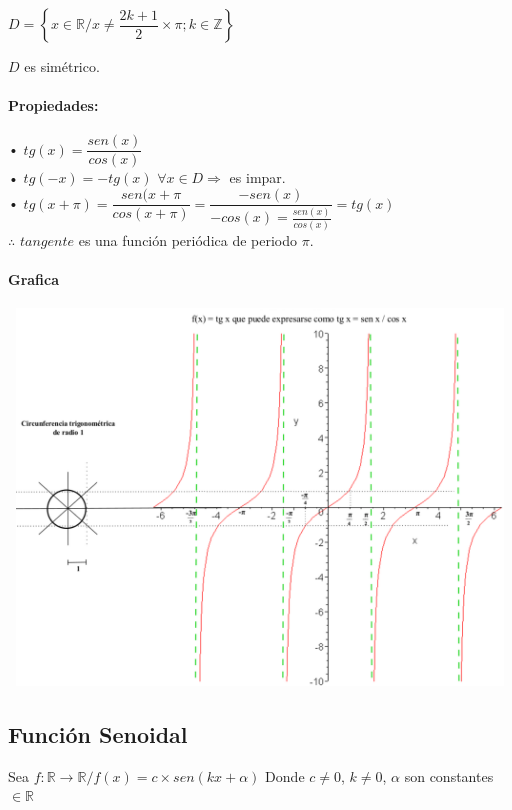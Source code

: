 \qquad $D = \left\{
 x \in \mathbb{R} / x \neq \dfrac{2k+1}{2} \times \pi ; k\in \mathbb{Z} \right\}$
 
\qquad \qquad $D$ es simétrico.

\paragraph{Propiedades:}


• $tg(x) = \dfrac{sen(x)}{cos(x)}$\\

• $tg(-x)=-tg(x)$ $\forall x \in D \Rightarrow$ es impar.\\

• $tg(x+\pi) = \dfrac{sen(x+\pi}{cos(x+\pi)}= \dfrac{-sen(x)}{-cos(x) = \frac{sen(x)}{cos(x)} }= tg(x)$\\
\qquad \qquad \qquad $\therefore$ $tangente$ es una función periódica de periodo $\pi$.
\paragraph{Grafica}
\begin{center}
\includegraphics[height=10cm,width=14cm]{tg.eps} 
\end{center}

\subsection{Función Senoidal}

Sea $f: \mathbb{R} \longrightarrow \mathbb{R} / f(x)= c \times sen(kx+\alpha)$  \quad Donde $c \neq 0$, $ k \neq 0$, $ \alpha $ son constantes $\in \mathbb{R}$\\

